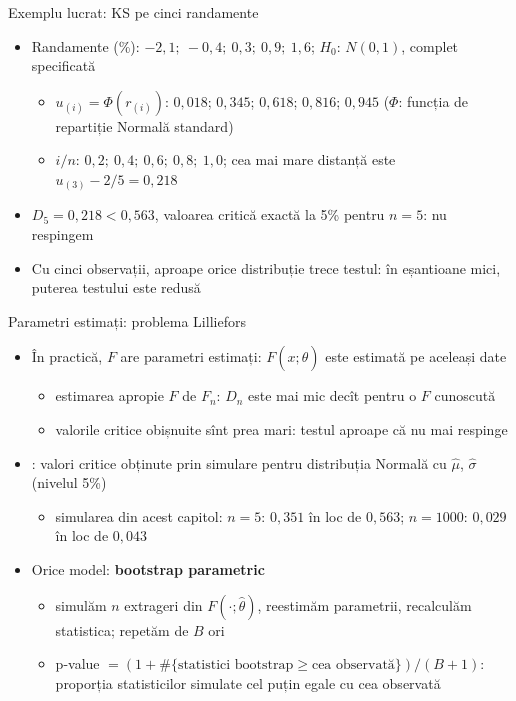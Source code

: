 \begin{frame}{Exemplu lucrat: KS pe cinci randamente}
\itemsize{\small}
\begin{itemize}
    \item Randamente (\%): $-2{,}1;\ -0{,}4;\ 0{,}3;\ 0{,}9;\ 1{,}6$; $H_0$: $N(0, 1)$, complet specificată
    \begin{itemize}
        \item $u_{(i)} = \Phi(r_{(i)})$: $0{,}018$; $0{,}345$; $0{,}618$; $0{,}816$; $0{,}945$ ($\Phi$: funcția de repartiție Normală standard)
        \item $i/n$: $0{,}2;\ 0{,}4;\ 0{,}6;\ 0{,}8;\ 1{,}0$; cea mai mare distanță este $u_{(3)} - 2/5 = 0{,}218$
    \end{itemize}
    \item $D_5 = 0{,}218 < 0{,}563$, valoarea critică exactă la 5\% pentru $n = 5$: nu respingem
    \item Cu cinci observații, aproape orice distribuție trece testul: în eșantioane mici, puterea testului este redusă
\end{itemize}
\end{frame}

\begin{frame}{Parametri estimați: problema Lilliefors}
\itemsize{\small}
\begin{itemize}
    \item În practică, $F$ are parametri estimați: $F(x; \hat\theta)$ este estimată pe aceleași date
    \begin{itemize}
        \item estimarea apropie $F$ de $F_n$: $D_n$ este mai mic decît pentru o $F$ cunoscută
        \item valorile critice obișnuite sînt prea mari: testul aproape că nu mai respinge
    \end{itemize}
    \item {}: valori critice obținute prin simulare pentru distribuția Normală cu $\hat\mu$, $\hat\sigma$ (nivelul 5\%)
    \begin{itemize}
        \item simularea din acest capitol: $n = 5$: $0{,}351$ în loc de $0{,}563$; $n = 1000$: $0{,}029$ în loc de $0{,}043$
    \end{itemize}
    \item Orice model: \textbf{bootstrap parametric} 
    \begin{itemize}
        \item simulăm $n$ extrageri din $F(\cdot; \hat\theta)$, reestimăm parametrii, recalculăm statistica; repetăm de $B$ ori
        \item p-value $= (1 + \#\{\text{statistici bootstrap} \ge \text{cea observată}\})/(B + 1)$: proporția statisticilor simulate cel puțin egale cu cea observată
    \end{itemize}
\end{itemize}
\end{frame}

